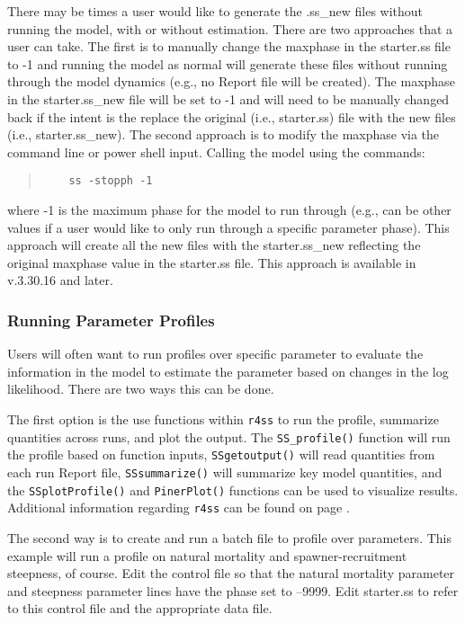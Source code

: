 There may be times a user would like to generate the .ss\_new files without running the model, with or without estimation. There are two approaches that a user can take.  The first is to manually change the maxphase in the starter.ss file to -1 and running the model as normal will generate these files without running through the model dynamics (e.g., no Report file will be created). The maxphase in the starter.ss\_new file will be set to -1 and will need to be manually changed back if the intent is the replace the original (i.e., starter.ss) file with the new files (i.e., starter.ss\_new).  The second approach is to modify the maxphase via the command line or power shell input. Calling the model using the commands:

\begin{quote}
	\begin{verbatim}
	ss -stopph -1
	\end{verbatim}
\end{quote}  

where -1 is the maximum phase for the model to run through (e.g., can be other values if a user would like to only run through a specific parameter phase). This approach will create all the new files with the starter.ss\_new reflecting the original maxphase value in the starter.ss file. This approach is available in v.3.30.16 and later.

\subsubsection{Running Parameter Profiles}
Users will often want to run profiles over specific parameter to evaluate the information in the model to estimate the parameter based on changes in the log likelihood.  There are two ways this can be done.

The first option is the use functions within \texttt{r4ss} to run the profile, summarize quantities across runs, and plot the output.  The \texttt{SS\_profile()} function will run the profile based on function inputs, \texttt{SSgetoutput()} will read quantities from each run Report file, \texttt{SSsummarize()} will summarize key model quantities, and the \texttt{SSplotProfile()} and \texttt{PinerPlot()} functions can be used to visualize results.  Additional information regarding \texttt{r4ss} can be found on page \pageref{r4ss}. 

The second way is to create and run a batch file to profile over parameters. This example will run a profile on natural mortality and spawner-recruitment steepness, of course.  Edit the control file so that the natural mortality parameter and steepness parameter lines have the phase set to –9999.  Edit starter.ss to refer to this control file and the appropriate data file.

